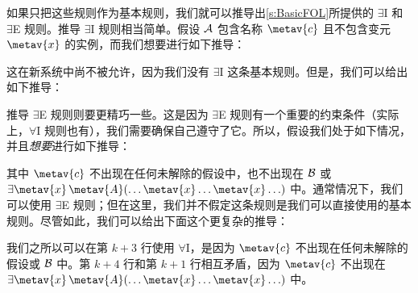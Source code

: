 如果只把这些规则作为基本规则，我们就可以推导出\cref{s:BasicFOL}所提供的 $\exists$I 和 $\exists$E 规则。推导 $\exists$I 规则相当简单。假设 $\mathcal{A}$ 包含名称 $\metav{c}$ 且不包含变元 $\metav{x}$ 的实例，而我们想要进行如下推导：
\begin{fitchproof}
\end{fitchproof}
这在新系统中尚不被允许，因为我们没有 $\exists$I 这条基本规则。但是，我们可以给出如下推导：
\begin{fitchproof}
	\open
		\AS
	\close
\end{fitchproof}\noindent
推导 $\exists$E 规则则要更精巧一些。这是因为 $\exists$E 规则有一个重要的约束条件（实际上，$\forall$I 规则也有），我们需要确保自己遵守了它。所以，假设我们处于如下情况，并且\emph{想要}进行如下推导：
\begin{fitchproof}
	\open
		\AS
	\close
\end{fitchproof}\noindent
 其中 $\metav{c}$ 不出现在任何未解除的假设中，也不出现在 $\mathcal{B}$ 或 $\exists \metav{x}\, \metav{A}(\ldots \metav{x} \ldots \metav{x}\ldots)$ 中。通常情况下，我们可以使用 $\exists$E 规则；但在这里，我们并不假定这条规则是我们可以直接使用的基本规则。尽管如此，我们可以给出下面这个更复杂的推导：

\begin{fitchproof}
	\open
		\AS
	\close
	\open
		\AS
	\close
\end{fitchproof}\noindent
我们之所以可以在第 $k+3$ 行使用 $\forall$I，是因为 $\metav{c}$ 不出现在任何未解除的假设或 $\mathcal{B}$ 中。第 $k+4$ 行和第 $k+1$ 行相互矛盾，因为 $\metav{c}$ 不出现在 $\exists \metav{x}\, \metav{A}(\ldots \metav{x} \ldots \metav{x} \ldots)$ 中。


